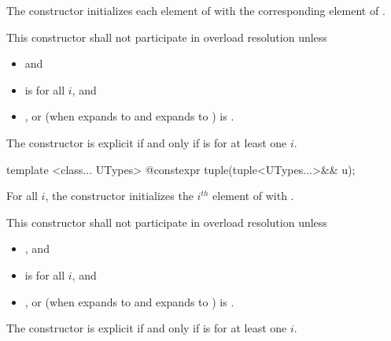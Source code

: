 \begin{itemdescr}
\pnum
\effects The constructor initializes each element of 
with the corresponding element of .

\pnum
\remarks This constructor shall not participate in overload resolution unless
\begin{itemize}
\item
{} \tcode{==}  and
\item
{} is  for all $i$, and
\item
{}, or
(when  expands to  and  expands to )\linebreak
{}
is .
\end{itemize}
The constructor is explicit if and only if
 is 
for at least one $i$.
\end{itemdescr}

%
\begin{itemdecl}
template <class... UTypes> @\EXPLICIT@ constexpr tuple(tuple<UTypes...>&& u);
\end{itemdecl}

\begin{itemdescr}
\pnum
\effects For all $i$, the constructor
initializes the $i^{th}$ element of  with
.

\pnum
\remarks This constructor shall not participate in overload resolution unless

\begin{itemize}
\item
{} \tcode{==} , and
\item
{} is  for all $i$, and
\item
{}, or
(when  expands to  and  expands to )\linebreak
{}
is .
\end{itemize}
The constructor is explicit if and only if
 is 
for at least one $i$.
\end{itemdescr}

